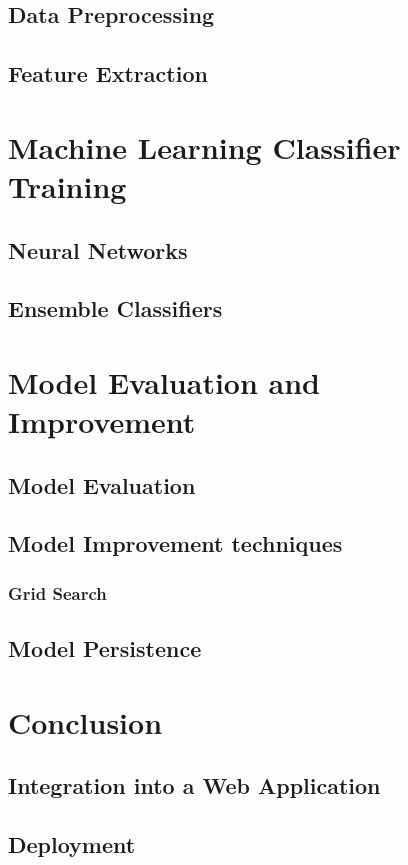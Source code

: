 \documentclass[a4paper,12pt]{report}
\begin{document}
	\section{Data Preprocessing}
	\section{Feature Extraction}
	
\chapter{Machine Learning Classifier Training}
	\section{Neural Networks}
	\section{Ensemble Classifiers}

\chapter{Model Evaluation and Improvement}
	\section{Model Evaluation}
	\section{Model Improvement techniques}
		\subsection{Grid Search}
	\section{Model Persistence} 
		
\chapter{Conclusion}
	\section{Integration into a Web Application}
	\section{Deployment}
\end{document}
